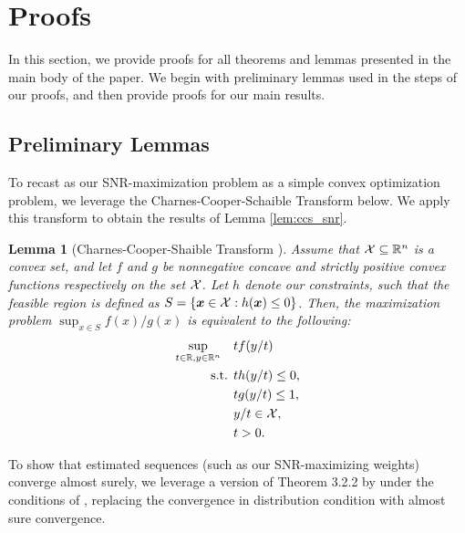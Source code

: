 \documentclass{article}
\newtheorem{lemma}{Lemma}
\begin{document}
\begin{appendices}
\begin{description}[
  leftmargin=2.2cm,
  labelwidth=2cm,
  labelsep=.2cm,
  parsep=0mm,
  itemsep=2pt
  ]
\end{description}


\newpage


\section{Proofs}\label{app:proofs}
In this section, we provide proofs for all theorems and lemmas presented in the main body of the paper. We begin with preliminary lemmas used in the steps of our proofs, and then provide proofs for our main results. 

\subsection{Preliminary Lemmas}\label{appsec:existing_lemmas}

To recast as our SNR-maximization problem as a simple convex optimization problem, we leverage the Charnes-Cooper-Schaible Transform below. We apply this transform to obtain the results of Lemma \ref{lem:ccs_snr}. 

\begin{lemma}[Charnes-Cooper-Shaible Transform \citep{schaible2016fractional}]\label{lemma:ccs_transform}
Assume that $\mathcal{X} \subseteq \mathbb{R}^n$ is a convex set, and let $f$ and $g$ be nonnegative concave and strictly positive convex functions respectively on the set $\mathcal{X}$. Let $h$ denote our constraints, such that the feasible region is defined as $S = \{\boldsymbol{x} \in \mathcal{X}: h(\boldsymbol{x}) \leq 0\}$. Then, the maximization problem $\sup_{x \in S} f(x) / g(x)$ is equivalent to the following:
\begin{align}
    \sup_{t \in \mathbb{R}, y \in \mathbb{R}^n} \quad& t f(y/t)\\
    \text{s.t. } 
    & th(y/t) \leq 0,  \\
    & tg(y/t) \leq 1, \\ 
    & y/t \in \mathcal{X}, \\
    & t > 0. 
\end{align}
\end{lemma}

To show that estimated sequences (such as our SNR-maximizing weights) converge almost surely, we leverage a version of Theorem 3.2.2 by \cite{vandervaart1996weak} under the conditions of \cite{white1984asymptotic}, replacing the convergence in distribution condition with almost sure convergence. 


\end{appendices}
\end{document}
